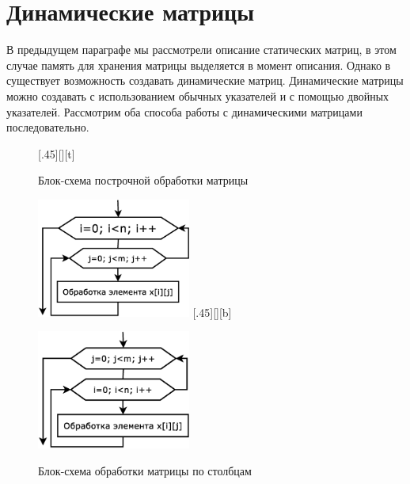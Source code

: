 \section{Динамические матрицы}
В предыдущем параграфе мы рассмотрели описание статических матриц, в этом случае память для хранения матрицы выделяется
в момент описания. Однако в  существует возможность создавать динамические матриц. Динамические матрицы
можно создавать с использованием обычных указателей и с помощью двойных указателей. Рассмотрим оба способа работы с
динамическими матрицами последовательно. 

\begin{figure}[H]
\begin{floatrow}
[.45\textwidth][\FBheight][t]
{\caption{Блок-схема построчной обработки матрицы}
\label{ch06:refDrawing0}}
{\includegraphics[width=0.45\textwidth,keepaspectratio]{img/ris_6_1}}\hspace*{0.05\textwidth}
%
[.45\textwidth][\FBheight][b]
{\caption{Блок-схема обработки матрицы по столбцам}
\label{ch06:refDrawing1}}
{\includegraphics[width=0.45\textwidth,keepaspectratio]{img/ris_6_2}}
\end{floatrow}
\end{figure}



